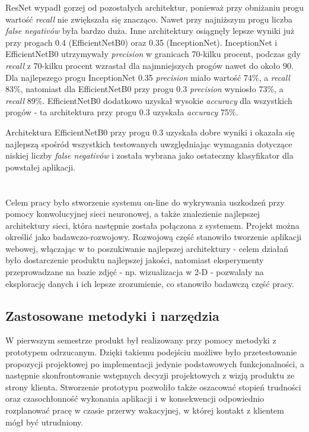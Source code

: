 \documentclass[polish,12pt]{aghthesis}
\begin{document}
ResNet wypadł gorzej od pozostałych architektur, ponieważ przy obniżaniu progu wartość \textit{recall} nie zwiększała się znacząco. Nawet przy najniższym progu liczba \textit{false negativów} była bardzo duża. Inne architektury osiągnęły lepsze wyniki już przy progach 0.4 (EfficientNetB0) oraz 0.35 (InceptionNet). InceptionNet i EfficientNetB0 utrzymywały \textit{precision} w granicach 70-kilku procent, podczas gdy \textit{recall} z 70-kilku procent wzrastał dla najmniejszych progów nawet do około 90. Dla najlepszego progu InceptionNet 0.35 \textit{precision} miało wartość 74\%, a \textit{recall} 83\%, natomiast dla EfficientNetB0 przy progu 0.3 \textit{precision} wyniosło 73\%, a \textit{recall} 89\%. EfficientNetB0 dodatkowo uzyskał wysokie \textit{accuracy} dla wszystkich progów - ta architektura przy progu 0.3 uzyskała \textit{accuracy} 75\%. 

Architektura EfficientNetB0 przy progu 0.3 uzyskała dobre wyniki i okazała się najlepszą spośród wszystkich testowanych uwzględniając wymagania dotyczące niskiej liczby \textit{false negativów} i została wybrana jako ostateczny klasyfikator dla powstałej aplikacji.

\newpage
\section{\SectionTitleWorkOrganization}
\label{sec:organizacja-pracy}

Celem pracy było stworzenie systemu on-line do wykrywania uszkodzeń przy pomocy konwolucyjnej sieci neuronowej, a także znalezienie najlepszej architektury sieci, która następnie została połączona z systemem. Projekt można określić jako badawczo-rozwojowy. Rozwojową część stanowiło tworzenie aplikacji webowej, włączając w to poszukiwanie najlepszej architektury - celem działań było dostarczenie produktu najlepszej jakości, natomiast eksperymenty przeprowadzane na bazie zdjęć - np. wizualizacja w 2-D - pozwalały na eksplorację danych i ich lepsze zrozumienie, co stanowiło badawczą część pracy. 

\subsection{Zastosowane metodyki i narzędzia}
W pierwszym semestrze produkt był realizowany przy pomocy metodyki z prototypem odrzucanym. Dzięki takiemu podejściu możliwe było przetestowanie propozycji projektowej po implementacji jedynie podstawowych funkcjonalności, a następnie skonfrontowanie wstępnych decyzji projektowych z wizją produktu ze strony klienta. Stworzenie prototypu pozwoliło także oszacować stopień trudności oraz czasochłonność wykonania aplikacji i w konsekwencji odpowiednio rozplanować pracę w czasie przerwy wakacyjnej, w której kontakt z klientem mógł być utrudniony. 
\end{document}
